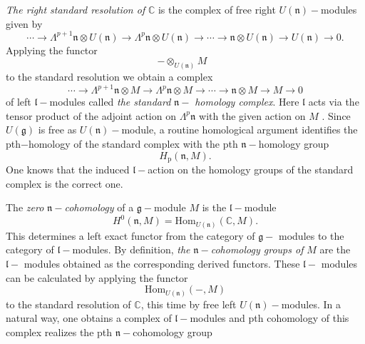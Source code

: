 
\emph{The right standard resolution of }$\mathbb{C}$ is the
complex of free right $U(\mathfrak{n})-$modules given by
\begin{equation*}
\cdots \rightarrow \Lambda ^{p+1}\mathfrak{n}\otimes U(\mathfrak{n}%
)\rightarrow \Lambda ^{p}\mathfrak{n}\otimes U(\mathfrak{n})\rightarrow
\cdots \rightarrow \mathfrak{n}\otimes U(\mathfrak{n})\rightarrow U(%
\mathfrak{n})\rightarrow 0\text{.}
\end{equation*}%
Applying the functor
\begin{equation*}
-\otimes _{U(\mathfrak{n})}M\text{ }
\end{equation*}%
to the standard resolution we obtain a complex
\begin{equation*}
\cdots \rightarrow \Lambda ^{p+1}\mathfrak{n}\otimes M\rightarrow \Lambda
^{p}\mathfrak{n}\otimes M\rightarrow \cdots \rightarrow \mathfrak{n}\otimes
M\rightarrow M\rightarrow 0
\end{equation*}%
of left $\mathfrak{l}-$modules called \emph{the standard} $\mathfrak{n}-$%
\emph{homology complex}. Here $\mathfrak{l}$ acts via the tensor product of
the adjoint action on $\Lambda ^{p}\mathfrak{n}$ with the given action on $M$%
. Since $U(\mathfrak{g})$ is free as $U(\mathfrak{n})-$module, a routine
homological argument identifies the pth$-$homology of the standard complex
with the pth $\mathfrak{n}-$homology group
\begin{equation*}
H_{\text{p}}(\mathfrak{n},M).
\end{equation*}%
One knows that the induced $\mathfrak{l}-$action on the homology groups of
the standard complex is the correct one.


The \emph{zero} $\mathfrak{n}-$\emph{cohomology }of a $\mathfrak{g}%
-$module $M$ is the $\mathfrak{l}-$module
\begin{equation*}
H^{0}(\mathfrak{n},M)=\text{Hom}_{U(\mathfrak{n})}(\mathbb{C},M).
\end{equation*}%
This determines a left exact functor from the category of $\mathfrak{g}-$%
modules to the category of $\mathfrak{l}-$modules. By definition, \emph{the}
$\mathfrak{n}-$\emph{cohomology groups of} $M$ are the $\mathfrak{l}-$%
modules obtained as the corresponding derived functors. These $\mathfrak{l}-$%
modules can be calculated by applying the functor
\begin{equation*}
\text{Hom}_{U(\mathfrak{n})}(-,M)
\end{equation*}%
to the standard resolution of $\mathbb{C}$, this time by free left $U(%
\mathfrak{n})-$modules. In a natural way, one obtains a complex of $%
\mathfrak{l}-$modules and pth cohomology of this complex realizes the pth $%
\mathfrak{n}-$cohomology group


